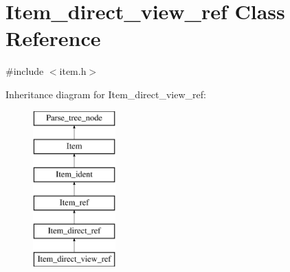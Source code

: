 \hypertarget{classItem__direct__view__ref}{}\section{Item\+\_\+direct\+\_\+view\+\_\+ref Class Reference}
\label{classItem__direct__view__ref}


{\ttfamily \#include $<$item.\+h$>$}

Inheritance diagram for Item\+\_\+direct\+\_\+view\+\_\+ref\+:\begin{figure}[H]
\begin{center}
\leavevmode
\includegraphics[height=6.000000cm]{classItem__direct__view__ref}
\end{center}
\end{figure}
